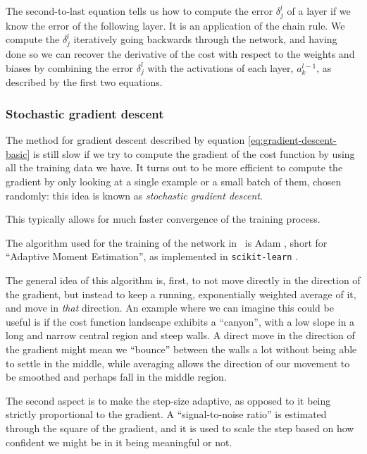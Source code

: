 \documentclass[main.tex]{subfiles}
\begin{document}
The second-to-last equation tells us how to compute the error \(\delta^{l}_{j}\) of a layer if we know the error of the following layer. 
It is an application of the chain rule. 
We compute the \(\delta^{l}_{j}\) iteratively going backwards through the network, and having done so we can recover the derivative of the cost with respect to the weights and biases by combining the error \(\delta^{l}_{j}\) with the activations of each layer, \(a^{l-1}_{k}\), as described by the first two equations. 

\subsubsection{Stochastic gradient descent}

The method for gradient descent described by equation \ref{eq:gradient-descent-basic} is still slow if we try to compute the gradient of the cost function by using all the training data we have. 
It turns out to be more efficient to compute the gradient by only looking at a single example or a small batch of them, chosen randomly: this idea is known as \emph{stochastic gradient descent}. 

This typically allows for much faster convergence of the training process.

The algorithm used for the training of the network in \mb \ is Adam \cite{kingmaAdamMethodStochastic2017,ruderOverviewGradientDescent2016}, short for ``Adaptive Moment Estimation'', as implemented in \texttt{scikit-learn} \cite[]{pedregosaScikitlearnMachineLearning2011}. 

The general idea of this algorithm is, first, to not move directly in the direction of the gradient, but instead to keep a running, exponentially weighted average of it, and move in \emph{that} direction. 
An example where we can imagine this could be useful is if the cost function landscape exhibits a ``canyon'', with a low slope in a long and narrow central region and steep walls. 
A direct move in the direction of the gradient might mean we ``bounce'' between the walls a lot without being able to settle in the middle, while averaging allows the direction of our movement to be smoothed and perhaps fall in the middle region. 

The second aspect is to make the step-size adaptive, as opposed to it being strictly proportional to the gradient.
A ``signal-to-noise ratio'' is estimated through the square of the gradient, and it is used to scale the step based on how confident we might be in it being meaningful or not. 
\end{document}
